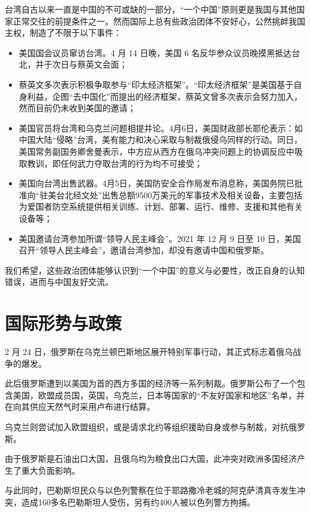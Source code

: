 \documentclass[12pt]{ctexrep}
\begin{document}
    台湾自古以来一直是中国的不可或缺的一部分，“一个中国”原则更是我国与其他国家正常交往的前提条件之一。然而国际上总有些政治团体不安好心，公然挑衅我国主权，制造了不限于以下事件：
    \begin{itemize}
        \item 美国国会议员窜访台湾。4 月 14 日晚，美国 6 名反华参众议员晚摸黑抵达台北，并于次日与蔡英文会面；
        \item 蔡英文多次表示积极争取参与“印太经济框架”。“印太经济框架”是美国基于自身利益，企图“去中国化”而提出的经济框架，蔡英文曾多次表示会努力加入，然而目前仍未收到美国的邀请；
        \item 美国官员将台湾和乌克兰问题相提并论。4月6日，美国财政部长耶伦表示：如中国大陆“侵略”台湾，美有能力和决心采取与制裁俄侵乌同样的行动。同日，美国常务副国务卿舍曼表示，中方应从西方在俄乌冲突问题上的协调反应中吸取教训，即任何武力夺取台湾的行为均不可接受；
        \item 美国向台湾出售武器。4月5日，美国防安全合作局发布消息称，美国务院已批准向“驻美台北经文处”出售总额9500万美元的军事技术及相关设备，主要包括为爱国者防空系统提供相关训练、计划、部署、运行、维修、支援和其他有关设备等；
        \item 美国邀请台湾参加所谓“领导人民主峰会”。2021 年 12 月 9 日至 10 日，美国召开“领导人民主峰会”，邀请台湾参加，却没有邀请中国和俄罗斯。
    \end{itemize}
    
    我们希望，这些政治团体能够认识到“一个中国”的意义与必要性，改正自身的认知错误，进而与中国友好交流。

    \chapter{国际形势与政策}

    2 月 24 日，俄罗斯在乌克兰顿巴斯地区展开特别军事行动，其正式标志着俄乌战争的爆发。

    此后俄罗斯遭到以美国为首的西方多国的经济等一系列制裁\cite{cit4.1}。俄罗斯公布了一个包含美国，欧盟成员国，英国，乌克兰，日本等国家的“不友好国家和地区”名单，并在向其供应天然气时采用卢布进行结算\cite{cit4.2}。

    乌克兰则尝试加入欧盟组织，或是请求北约等组织援助自身或参与制裁，对抗俄罗斯。

    由于俄罗斯是石油出口大国，且俄乌均为粮食出口大国，此冲突对欧洲多国经济产生了重大负面影响。

    与此同时，巴勒斯坦民众与以色列警察在位于耶路撒冷老城的阿克萨清真寺发生冲突，造成160多名巴勒斯坦人受伤，另有约400人被以色列警方拘捕\cite{cit4.3}。
    
    
\end{document}
